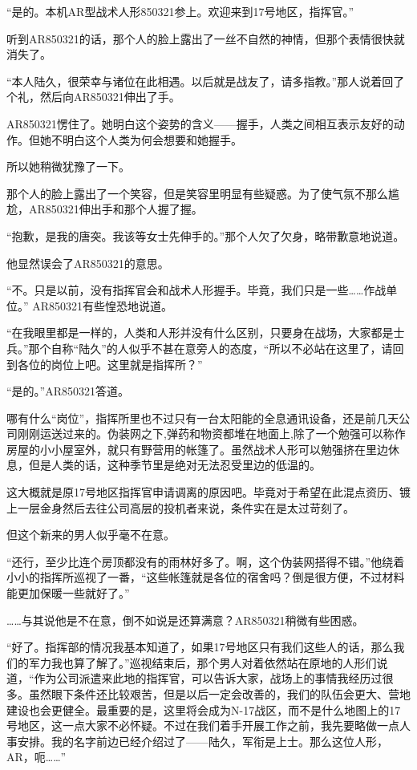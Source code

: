 “是的。本机AR型战术人形850321参上。欢迎来到17号地区，指挥官。”

听到AR850321的话，那个人的脸上露出了一丝不自然的神情，但那个表情很快就消失了。

“本人陆久，很荣幸与诸位在此相遇。以后就是战友了，请多指教。”那人说着回了个礼，然后向AR850321伸出了手。

AR850321愣住了。她明白这个姿势的含义——握手，人类之间相互表示友好的动作。但她不明白这个人类为何会想要和她握手。

所以她稍微犹豫了一下。

那个人的脸上露出了一个笑容，但是笑容里明显有些疑惑。为了使气氛不那么尴尬，AR850321伸出手和那个人握了握。

“抱歉，是我的唐突。我该等女士先伸手的。”那个人欠了欠身，略带歉意地说道。

他显然误会了AR850321的意思。

“不。只是以前，没有指挥官会和战术人形握手。毕竟，我们只是一些……作战单位。” AR850321有些惶恐地说道。

“在我眼里都是一样的，人类和人形并没有什么区别，只要身在战场，大家都是士兵。”那个自称“陆久”的人似乎不甚在意旁人的态度，“所以不必站在这里了，请回到各位的岗位上吧。这里就是指挥所？”

“是的。”AR850321答道。

哪有什么“岗位”，指挥所里也不过只有一台太阳能的全息通讯设备，还是前几天公司刚刚运送过来的。伪装网之下,弹药和物资都堆在地面上,除了一个勉强可以称作房屋的小小屋室外，就只有野营用的帐篷了。虽然战术人形可以勉强挤在里边休息，但是人类的话，这种季节里是绝对无法忍受里边的低温的。

这大概就是原17号地区指挥官申请调离的原因吧。毕竟对于希望在此混点资历、镀上一层金身然后去往公司高层的投机者来说，条件实在是太过苛刻了。

但这个新来的男人似乎毫不在意。

“还行，至少比连个房顶都没有的雨林好多了。啊，这个伪装网搭得不错。”他绕着小小的指挥所巡视了一番，“这些帐篷就是各位的宿舍吗？倒是很方便，不过材料能更加保暖一些就好了。”

……与其说他是不在意，倒不如说是还算满意？AR850321稍微有些困惑。

“好了。指挥部的情况我基本知道了，如果17号地区只有我们这些人的话，那么我们的军力我也算了解了。”巡视结束后，那个男人对着依然站在原地的人形们说道，“作为公司派遣来此地的指挥官，可以告诉大家，战场上的事情我经历过很多。虽然眼下条件还比较艰苦，但是以后一定会改善的，我们的队伍会更大、营地建设也会更健全。最重要的是，这里将会成为N-17战区，而不是什么地图上的17号地区，这一点大家不必怀疑。不过在我们着手开展工作之前，我先要略做一点人事安排。我的名字前边已经介绍过了——陆久，军衔是上士。那么这位人形，AR，呃……”

